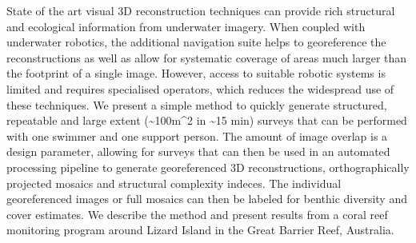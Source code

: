 
State of the art visual 3D reconstruction techniques can provide rich structural and ecological information from underwater imagery. When coupled with underwater robotics, the additional navigation suite helps to georeference the reconstructions as well as allow for systematic coverage of areas much larger than the footprint of a single image. However, access to suitable robotic systems is limited and requires specialised operators, which reduces the widespread use of these techniques. 
We present a simple method to quickly generate structured, repeatable and large extent (\sim{100m^{2}} in \sim{15 min}) surveys that can be performed with one swimmer and one support person. The amount of image overlap is a design parameter, allowing for surveys that can then be used in an automated processing pipeline to generate georeferenced 3D reconstructions, orthographically projected mosaics and structural complexity indeces. The individual georeferenced images or full mosaics can then be labeled for benthic diversity and cover estimates.
We describe the method and present results from a coral reef monitoring program around Lizard Island in the Great Barrier Reef, Australia.
  
  
